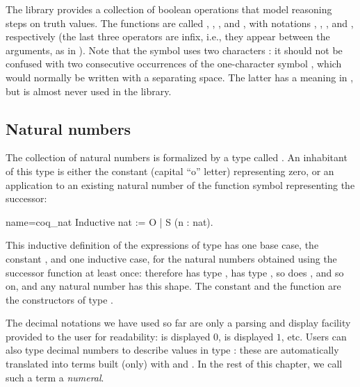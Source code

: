 The \mcbMC{} library provides a collection of boolean operations that
model reasoning steps on truth values.  The functions are called
, , , and , with notations
\C{\~\~},  \C{||}, \C{&&}, and \C{==>}, respectively
(the last three operators are
infix, i.e., they appear between the arguments, as in ).
Note that the symbol \C{\~\~} uses two characters \C{\~}: it should
not be confused with two consecutive occurrences of the one-character symbol
\C{\~}, which would normally be written with a separating space.
The latter has a meaning in \Coq{}, but is almost never used
in the \mcbMC{} library.


\subsection{Natural numbers}
\label{ssec:nat}

The collection of natural numbers is formalized by a type called
.  An inhabitant of this type is either the constant 
(capital ``o'' letter) representing zero, or an
application to an existing natural number of the function symbol 
representing the successor:

\begin{coq}{name=coq_nat}{}
Inductive nat := O | S (n : nat).
\end{coq}

This inductive definition of the expressions of type  has one
base case, the constant , and one inductive case, for the natural
numbers obtained using the successor function at least once: therefore
 has type ,  has type , so does
, and
so on, and any natural number has this shape. The constant  and
the function  are the constructors of type .

The decimal
notations we have used so far are only a parsing and display
facility provided to the user for readability:  is displayed
$0$,  is displayed $1$, etc.  Users can also type decimal
numbers to describe values in type : these are automatically
translated into terms built (only) with  and . In the rest
of this chapter, we call such a term a \emph{numeral}.

